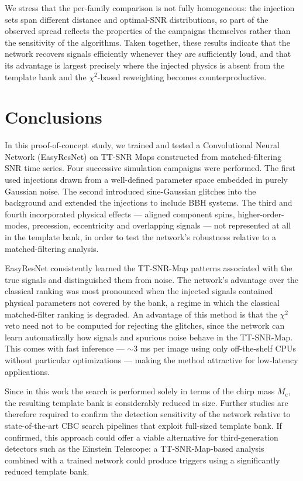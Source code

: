 \documentclass[aps,prd,twocolumn,superscriptaddress,nofootinbib, longbibliography]{revtex4-2}
\begin{document}
	We stress that the per-family comparison is not fully homogeneous: the injection sets span different distance and optimal-SNR distributions, so part of the observed spread reflects the properties of the campaigns themselves rather than the sensitivity of the algorithms. Taken together, these results indicate that the network recovers signals efficiently whenever they are sufficiently loud, and that its advantage is largest precisely where the injected physics is absent from the template bank and the $\chi^2$-based reweighting becomes counterproductive. 
	
	


\section{Conclusions} \label{conclusions}

	In this proof-of-concept study, we trained and tested a Convolutional Neural Network (EasyResNet) on TT-SNR Maps constructed from matched-filtering SNR time series. Four successive simulation campaigns were performed. The first used injections drawn from a well-defined parameter space embedded in purely Gaussian noise. The second introduced sine-Gaussian glitches into the background and extended the injections to include BBH systems. The third and fourth incorporated physical effects --- aligned component spins, higher-order-modes, precession, eccentricity and overlapping signals --- not represented at all in the template bank, in order to test the network's robustness relative to a matched-filtering analysis. 
	
	EasyResNet consistently learned the TT-SNR-Map patterns associated with the true signals and distinguished them from noise. The network's advantage over the classical ranking was most pronounced when the injected signals contained physical parameters not covered by the bank, a regime in which the classical matched-filter ranking is degraded. An advantage of this method is that the $\chi^2$ veto need not to be computed for rejecting the glitches, since the network can learn automatically how signals and spurious noise behave in the TT-SNR-Map. This comes with fast inference --- $\sim 3$ ms per image using only off-the-shelf CPUs without particular optimizations --- making the method attractive for low-latency applications. 
	
	Since in this work the search is performed solely in terms of the chirp mass $M_\mathrm{c}$, the resulting template bank is considerably reduced in size. Further studies are therefore required to confirm the detection sensitivity of the network relative to state-of-the-art CBC search pipelines that exploit full-sized template bank. If confirmed, this approach could offer a viable alternative for third-generation detectors such as the Einstein Telescope: a TT-SNR-Map-based analysis combined with a trained network could produce triggers using a significantly reduced template bank.
	
\end{document}
